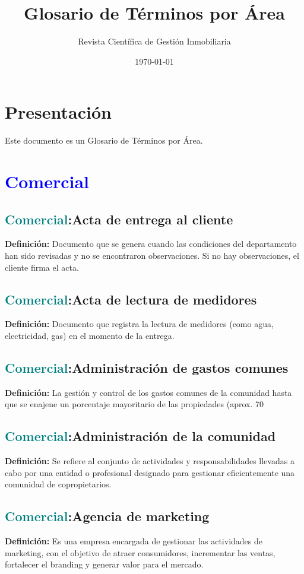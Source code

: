 \documentclass[12pt]{article}
\title{\textbf{Glosario de Términos por Área}}
\author{Revista Científica de Gestión Inmobiliaria}
\date{\today}
\begin{document}
\maketitle
\tableofcontents
\section*{Presentación}
Este documento es un Glosario de Términos por Área. 
\newpage
\section{\textcolor{blue}{Comercial}}
\subsection{\textcolor{teal}{Comercial}:{Acta de entrega al cliente}}
\textbf{Definición:} Documento que se genera cuando las condiciones del departamento han sido revisadas y no se encontraron observaciones. Si no hay observaciones, el cliente firma el acta.
\subsection{\textcolor{teal}{Comercial}:{Acta de lectura de medidores}}
\textbf{Definición:} Documento que registra la lectura de medidores (como agua, electricidad, gas) en el momento de la entrega.
\subsection{\textcolor{teal}{Comercial}:{Administración de gastos comunes}}
\textbf{Definición:} La gestión y control de los gastos comunes de la comunidad hasta que se enajene un porcentaje mayoritario de las propiedades (aprox. 70%
\subsection{\textcolor{teal}{Comercial}:{Administración de la comunidad}}
\textbf{Definición:} Se refiere al conjunto de actividades y responsabilidades llevadas a cabo por una entidad o profesional designado para gestionar eficientemente una comunidad de copropietarios. 
\subsection{\textcolor{teal}{Comercial}:{Agencia de marketing}}
\textbf{Definición:} Es una empresa encargada de gestionar las actividades de marketing, con el objetivo de atraer consumidores, incrementar las ventas, fortalecer el branding y generar valor para el mercado.
\end{document}

